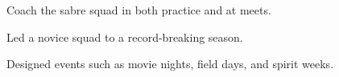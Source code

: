 \documentclass[letterpaper]{deedy-resume} %
\begin{document}
\begin{minipage}[t]{0.58\textwidth}


\begin{tightitemize}
\item Coach the sabre squad in both practice and at meets.
\item Led a novice squad to a record-breaking season.
\end{tightitemize}

\sectionspace


\begin{tightitemize}
\item Designed events such as movie nights, field days, and spirit weeks.
\end{tightitemize}

\sectionspace %









\end{minipage}
\end{document}
